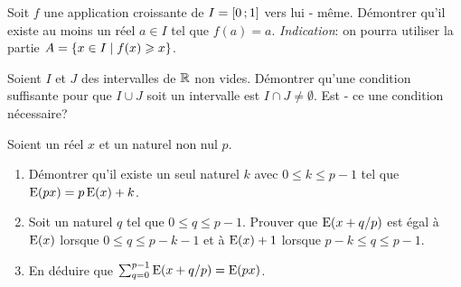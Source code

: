 \begin{exercice}
  Soit \(f\) une application croissante de \(I = \left[ 0 \, ; {} 1 \right]\) vers lui
  - même. Démontrer qu'il existe au moins un réel \(a \in I\) tel que \(f(a) =
  a\).
  \emph{Indication}: on pourra utiliser la partie \(A = \left\{x \in I\mathrel{}\middle|\mathrel{}f(x)
  \geqslant x\right\}\).
\end{exercice}

\begin{exercice}
  Soient \(I\) et \(J\) des intervalles de \(\mathbb{R}\) non vides. Démontrer qu'une
  condition suffisante pour que \(I \cup J\) soit un intervalle est \(I \cap J
  \neq \emptyset\). Est - ce une condition nécessaire?
\end{exercice}

\begin{exercice}
  Soient un réel \(x\) et un naturel non nul \(p\).
  \begin{enumerate}
    \item Démontrer qu'il existe un seul naturel \(k\) avec \(0 \leqslant k
      \leqslant p - 1\) tel que \(\operatorname{E}(px) = p\operatorname{E}(x) + k\).
    \item Soit un naturel \(q\) tel que \(0 \leqslant q \leqslant p - 1\).
      Prouver que \(\operatorname{E}(x + q/p)\) est égal à \(\operatorname{E}(x)\) lorsque \(0 \leqslant
      q \leqslant p - k - 1\) et à \(\operatorname{E}(x) + 1\) lorsque \(p - k\leqslant q
      \leqslant p - 1\).
    \item En déduire que \(\sum_{q = 0}^{p - 1} \operatorname{E}(x + q/p) = \operatorname{E}(px)\).
  \end{enumerate}
\end{exercice}
